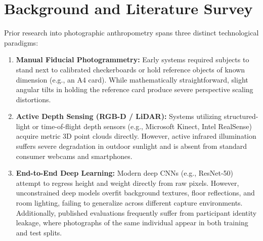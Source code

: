 \documentclass[12pt,a4paper,oneside]{report}
\begin{document}
\section{Background and Literature Survey}
Prior research into photographic anthropometry spans three distinct technological paradigms:
\begin{enumerate}[label=(\alph*)]
    \item \textbf{Manual Fiducial Photogrammetry:} Early systems required subjects to stand next to calibrated checkerboards or hold reference objects of known dimension (e.g., an A4 card). While mathematically straightforward, slight angular tilts in holding the reference card produce severe perspective scaling distortions.
    \item \textbf{Active Depth Sensing (RGB-D / LiDAR):} Systems utilizing structured-light or time-of-flight depth sensors (e.g., Microsoft Kinect, Intel RealSense) acquire metric 3D point clouds directly. However, active infrared illumination suffers severe degradation in outdoor sunlight and is absent from standard consumer webcams and smartphones.
    \item \textbf{End-to-End Deep Learning:} Modern deep CNNs (e.g., ResNet-50) attempt to regress height and weight directly from raw pixels. However, unconstrained deep models overfit background textures, floor reflections, and room lighting, failing to generalize across different capture environments. Additionally, published evaluations frequently suffer from participant identity leakage, where photographs of the same individual appear in both training and test splits.
\end{enumerate}

\begin{table}[H]
\centering
\caption{State-of-the-Art Literature Survey and Methodological Comparison}
\label{tab:lit_survey}
\end{table}
\end{document}
